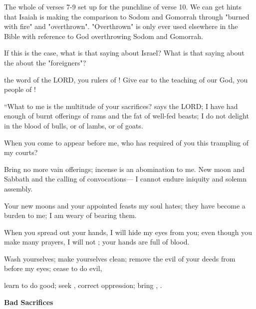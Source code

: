 \documentclass[11pt]{article}
\begin{document}
The whole of verses 7-9 set up for the punchline of verse 10. We can get hints that Isaiah is making
the comparison to Sodom and Gomorrah through "burned with fire" and "overthrown". "Overthrown" is only ever
used elsewhere in the Bible with reference to God overthrowing Sodom and Gomorrah.

{\vspace{1em}}
If this is the case, what is that saying about Israel? What is that saying about the about the "foreigners"?


\begin{biblicaloutline}[Isaiah 1:10-17]

    \begin{versesection}{2em}
  the word of the LORD, you rulers of !
\poetryline \textcolor{highlightgreen}{Give ear} to the teaching of our God, you people of !

 ``What to me is the multitude of your sacrifices? says the LORD;
\poetryline I have had enough of burnt offerings of rams
\poetryline and the fat of well-fed beasts;
I do not delight in the blood of bulls,
\poetryline or of lambs, or of goats.

 When you come to appear before me,
\poetryline who has required of you this trampling of my courts?

 Bring no more vain offerings;
\poetryline incense is an abomination to me.
New moon and Sabbath and the calling of convocations---
\poetryline I cannot endure iniquity and solemn assembly.

 Your new moons and your appointed feasts my soul hates;
\poetryline they have become a burden to me;
\poetryline I am weary of bearing them.

 When you spread out your hands,
\poetryline I will hide my eyes from you;
even though you make many prayers,
\poetryline I will not ;
\poetryline your hands are full of blood.

 Wash yourselves; make yourselves clean;
\poetryline remove the evil of your deeds from before my eyes;
\poetryline cease to do evil,

 learn to do good; seek , correct oppression;
\poetryline bring  ,
\poetryline {}.
    \end{versesection}

\end{biblicaloutline}
{\vspace{4em}}
{\large\bfseries Bad Sacrifices}
{\vspace{1em}}
\end{document}
